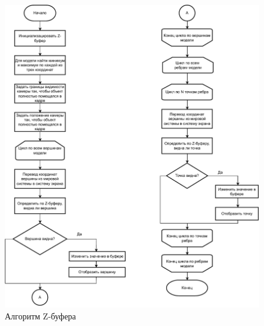 \begin{figure}[H]
	\centering
	\includegraphics[scale=0.83]{images/z_buffer_morph.pdf}
	\caption{Алгоритм Z-буфера}
	\label{fig:z-buffer}
\end{figure}

\newpage

